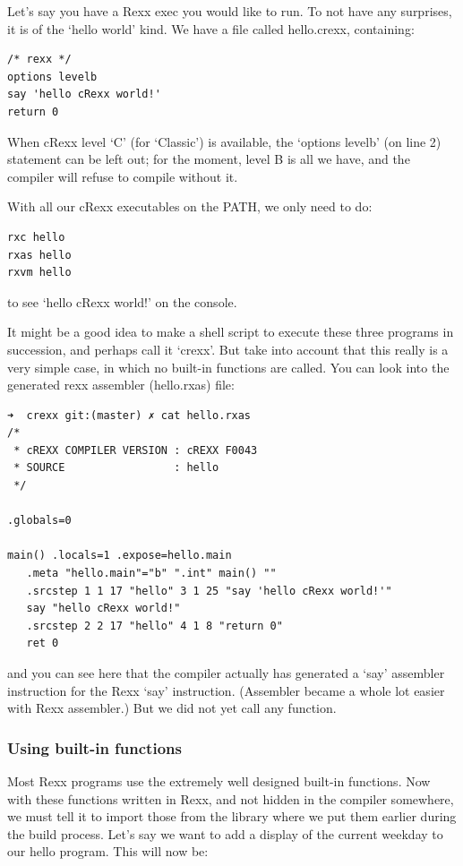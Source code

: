 Let's say you have a Rexx exec you would like to run. To not have any
surprises, it is of the `hello world' kind. We have a file called
hello.crexx, containing:

\begin{verbatim}
/* rexx */
options levelb
say 'hello cRexx world!'
return 0
\end{verbatim}

When cRexx level `C' (for `Classic') is available, the `options levelb'
(on line 2) statement can be left out; for the moment, level B is all we
have, and the compiler will refuse to compile without it.

With all our cRexx executables on the PATH, we only need to do:

\begin{verbatim}
rxc hello
rxas hello
rxvm hello
\end{verbatim}

to see `hello cRexx world!' on the console.

It might be a good idea to make a shell script to execute these three
programs in succession, and perhaps call it `crexx'. But take into
account that this really is a very simple case, in which no built-in
functions are called. You can look into the generated rexx assembler
(hello.rxas) file:

\begin{verbatim}
➜  crexx git:(master) ✗ cat hello.rxas
/*
 * cREXX COMPILER VERSION : cREXX F0043
 * SOURCE                 : hello
 */

.globals=0

main() .locals=1 .expose=hello.main
   .meta "hello.main"="b" ".int" main() ""
   .srcstep 1 1 17 "hello" 3 1 25 "say 'hello cRexx world!'"
   say "hello cRexx world!"
   .srcstep 2 2 17 "hello" 4 1 8 "return 0"
   ret 0
\end{verbatim}

and you can see here that the compiler actually has generated a `say'
assembler instruction for the Rexx `say' instruction. (Assembler became
a whole lot easier with Rexx assembler.) But we did not yet call any
function.

\hypertarget{using-built-in-functions}{%
\subsubsection{Using built-in
functions}\label{using-built-in-functions}}

Most Rexx programs use the extremely well designed built-in functions.
Now with these functions written in Rexx, and not hidden in the compiler
somewhere, we must tell it to import those from the library where we put
them earlier during the build process. Let's say we want to add a
display of the current weekday to our hello program. This will now be:

